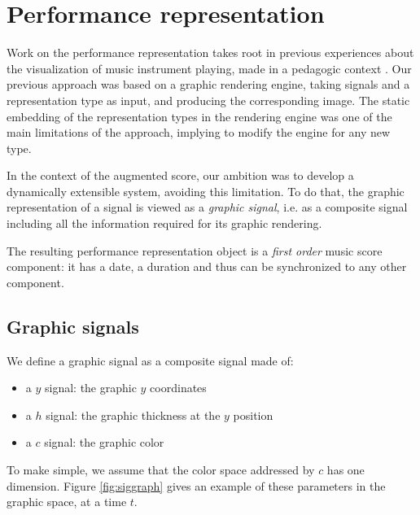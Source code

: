 \documentclass{article}
\begin{document}
\section{Performance representation}

Work on the performance representation takes root in previous experiences about the visualization of music instrument playing, made in a pedagogic context \cite{Fober:07b}. Our previous approach was based on a graphic rendering engine, taking signals and a representation type as input, and producing the corresponding image.
The static embedding of the representation types in the rendering engine was one of the main limitations of the approach, implying to modify the engine for any new type.

In the context of the augmented score, our ambition was to develop a dynamically extensible system, avoiding this limitation. To do that, the graphic representation of a signal is viewed as a \emph{graphic signal}, i.e. as a composite signal including all the information required for its graphic rendering.

The resulting performance representation object is a \emph{first order} music score component: it has a date, a duration and thus can be synchronized to any other component.


\subsection{Graphic signals}

We define a graphic signal as a composite signal made of:
\begin{itemize}
\item a $y$ signal: the graphic $y$ coordinates
\item a $h$ signal: the graphic thickness at the $y$ position
\item a $c$ signal: the graphic color
\end{itemize}
To make simple, we assume that the color space addressed by $c$ has one dimension.
Figure \ref{fig:siggraph} gives an example of these parameters in the graphic space, at a time $t$. 
\end{document}
